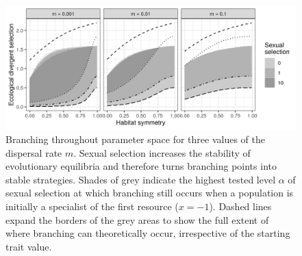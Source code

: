 \begin{figure}

    \centering
    \includegraphics[width=\textwidth]{figures/map_branching_points}
    \caption{Branching throughout parameter space for three values of the dispersal rate $m$. Sexual selection increases the stability of evolutionary equilibria and therefore turns branching points into stable strategies. Shades of grey indicate the highest tested level $\alpha$ of sexual selection at which branching still occurs when a population is initially a specialist of the first resource ($x = -1$). Dashed lines expand the borders of the grey areas to show the full extent of where branching can theoretically occur, irrespective of the starting trait value.}
    \label{fig:adaptive_dynamics}
    
\end{figure}